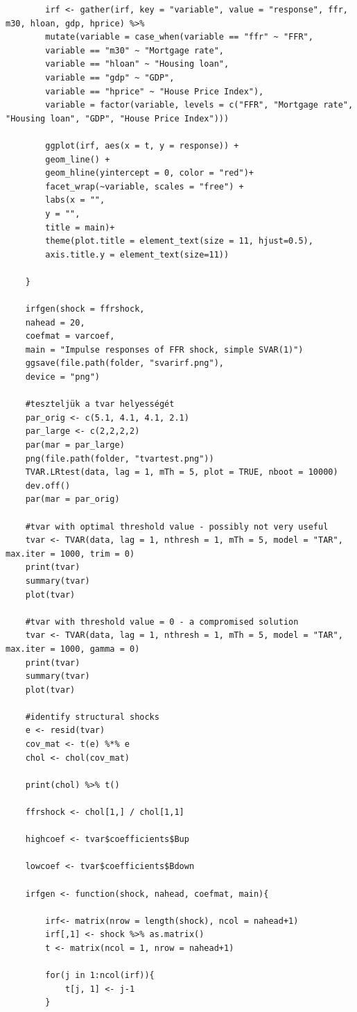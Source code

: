 \documentclass[12pt,a4paper]{article}
\begin{document}
\begin{verbatim}
		irf <- gather(irf, key = "variable", value = "response", ffr, m30, hloan, gdp, hprice) %>%
		mutate(variable = case_when(variable == "ffr" ~ "FFR",
		variable == "m30" ~ "Mortgage rate",
		variable == "hloan" ~ "Housing loan",
		variable == "gdp" ~ "GDP",
		variable == "hprice" ~ "House Price Index"),
		variable = factor(variable, levels = c("FFR", "Mortgage rate", "Housing loan", "GDP", "House Price Index")))
		
		ggplot(irf, aes(x = t, y = response)) +
		geom_line() +
		geom_hline(yintercept = 0, color = "red")+
		facet_wrap(~variable, scales = "free") +
		labs(x = "",
		y = "",
		title = main)+
		theme(plot.title = element_text(size = 11, hjust=0.5),
		axis.title.y = element_text(size=11))
		
	}
	
	irfgen(shock = ffrshock,
	nahead = 20,
	coefmat = varcoef,
	main = "Impulse responses of FFR shock, simple SVAR(1)")
	ggsave(file.path(folder, "svarirf.png"),
	device = "png")
	
	#teszteljük a tvar helyességét
	par_orig <- c(5.1, 4.1, 4.1, 2.1)
	par_large <- c(2,2,2,2)
	par(mar = par_large)
	png(file.path(folder, "tvartest.png"))
	TVAR.LRtest(data, lag = 1, mTh = 5, plot = TRUE, nboot = 10000)
	dev.off()
	par(mar = par_orig)
	
	#tvar with optimal threshold value - possibly not very useful
	tvar <- TVAR(data, lag = 1, nthresh = 1, mTh = 5, model = "TAR", max.iter = 1000, trim = 0)  
	print(tvar)
	summary(tvar)
	plot(tvar)
	
	#tvar with threshold value = 0 - a compromised solution
	tvar <- TVAR(data, lag = 1, nthresh = 1, mTh = 5, model = "TAR", max.iter = 1000, gamma = 0)  
	print(tvar)
	summary(tvar)
	plot(tvar)
	
	#identify structural shocks
	e <- resid(tvar)
	cov_mat <- t(e) %*% e
	chol <- chol(cov_mat)
	
	print(chol) %>% t()
	
	ffrshock <- chol[1,] / chol[1,1]
	
	highcoef <- tvar$coefficients$Bup
	
	lowcoef <- tvar$coefficients$Bdown
	
	irfgen <- function(shock, nahead, coefmat, main){
		
		irf<- matrix(nrow = length(shock), ncol = nahead+1)
		irf[,1] <- shock %>% as.matrix()
		t <- matrix(ncol = 1, nrow = nahead+1)
		
		for(j in 1:ncol(irf)){
			t[j, 1] <- j-1
		}
		

\end{verbatim}
\end{document}
